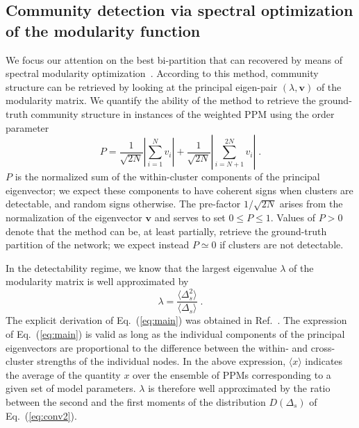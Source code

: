 \documentclass[a4paper,pre,superscriptaddress,floatfix,nofootinbib,twocolumn]{revtex4-1}
\begin{document}
\subsection*{Community detection via spectral optimization of the modularity function}

We focus our attention on the best bi-partition that can recovered by means of spectral modularity optimization~\cite{newman2006modularity}. According to this method, community structure can be retrieved by looking at the principal eigen-pair $(\lambda, \mathbf{v})$ of the modularity matrix. We quantify the ability of the method to retrieve the ground-truth community structure in instances of the weighted PPM using the order parameter
\begin{equation}
P = \frac{1}{\sqrt{2N}}  \left|\sum_{i=1}^{N} v_i \right|  + \frac{1}{\sqrt{2N}}  \left|\sum_{i=N+1}^{2N} v_i \right|   \; .
    \label{eq:order}
\end{equation}
$P$ is the normalized sum of the within-cluster components of the principal eigenvector; we expect these components to have coherent signs when clusters are detectable, and random signs otherwise. The pre-factor $1/\sqrt{2N}$ arises from the normalization of the eigenvector $\mathbf{v}$ and serves to set $0 \leq P \leq 1$. Values of $P > 0$ denote that the method can be, at least partially, retrieve the ground-truth partition of the network; we expect instead $P \simeq 0$ if clusters are not detectable.


In the detectability regime, we know that the largest eigenvalue $\lambda$ of the modularity matrix is well approximated by
\begin{equation}
\lambda = \frac{\langle \Delta_s^2 \rangle}{\langle \Delta_s \rangle} \; .
\label{eq:main}
\end{equation}
The explicit derivation of Eq.~(\ref{eq:main}) was obtained in Ref.~\cite{radicchi2013detectability}.
The expression of Eq.~(\ref{eq:main}) is valid as long as the individual components of the principal eigenvectors are
proportional to the difference between the within- and cross-cluster strengths of the individual nodes.
In the above expression,
$\langle x \rangle$ indicates the average of the quantity $x$ over the ensemble of PPMs corresponding to a given set of model parameters. $\lambda$ is therefore well approximated by the ratio between the second and the first moments of the distribution $D(\Delta_s)$ of Eq.~(\ref{eq:conv2}).
\end{document}
